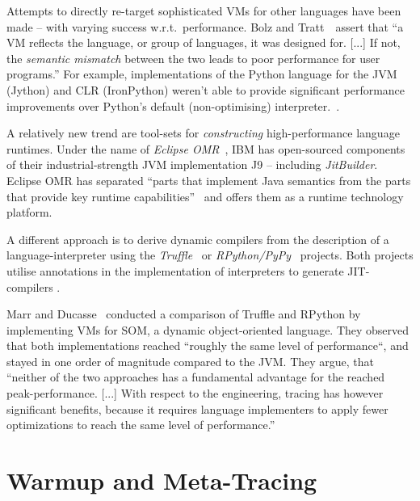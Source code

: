 Attempts to directly re-target sophisticated VMs for other languages have been
made -- with varying success w.r.t.~performance. Bolz and
Tratt~\cite{bolz14impact}~assert that ``a VM reflects the language, or group of
languages, it was designed for. [...] If not, the \emph{semantic mismatch}
between the two leads to poor performance for user programs.'' For example,
implementations of the Python language for the JVM (Jython) and CLR (IronPython)
weren't able to provide significant performance improvements over Python's
default (non-optimising) interpreter.~\cite{bolz14impact}.

A relatively new trend are tool-sets for \emph{constructing} high-performance
language runtimes. Under the name of \emph{Eclipse
OMR}~\cite{gaudet2016rebuilding}, IBM has open-sourced components of their
industrial-strength JVM implementation J9 -- including \emph{JitBuilder}.
Eclipse OMR has separated ``parts that implement Java semantics from the parts
that provide key runtime capabilities''~\cite{eclipseOMR} and offers them as a
runtime technology platform.

A different approach is to derive dynamic compilers from the description of a
language-interpreter using the
\emph{Truffle}~\cite{wurthinger2013one} or
\emph{RPython/PyPy}~\cite{bolz2009tracing} projects. Both projects utilise
annotations in the implementation of interpreters to generate JIT-compilers
.

Marr and Ducasse~\cite{marr2015tracing} conducted a  comparison of Truffle and
RPython by implementing VMs for SOM, a dynamic object-oriented language. They
observed that both implementations reached ``roughly the same level of
performance``, and stayed in one order of magnitude compared to the JVM. They
argue, that ``neither of the two approaches has a fundamental advantage for the
reached peak-performance. [...] With respect to the engineering, tracing has
however significant benefits, because it requires language implementers to apply
fewer optimizations to reach the same level of performance.''



\section{Warmup and Meta-Tracing}

